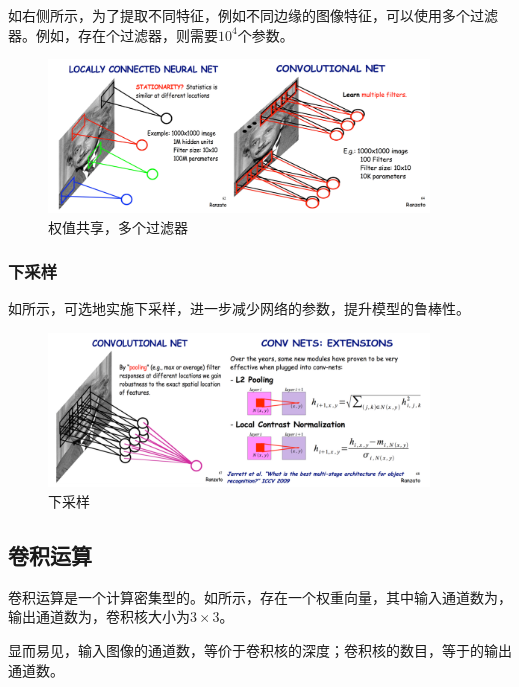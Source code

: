 \begin{content}
如右侧所示，为了提取不同特征，例如不同边缘的图像特征，可以使用多个过滤器。例如，存在个过滤器，则需要$10^4$个参数。

\begin{figure}[H]
\centering
\includegraphics[width=0.9\textwidth]{figures/mnist-conv-local-conn-2.png}
\caption{权值共享，多个过滤器}
 \label{fig:mnist-conv-local-conn-2}
\end{figure}

\subsubsection{下采样}

如所示，可选地实施下采样，进一步减少网络的参数，提升模型的鲁棒性。

\begin{figure}[H]
\centering
\includegraphics[width=0.9\textwidth]{figures/mnist-subsample.png}
\caption{下采样}
 \label{fig:mnist-subsample}
\end{figure}

\subsection{卷积运算}

卷积运算是一个计算密集型的。如所示，存在一个权重向量，其中输入通道数为，输出通道数为，卷积核大小为$3 \times 3$。

显而易见，输入图像的通道数，等价于卷积核的深度；卷积核的数目，等于的输出通道数。


\end{content}
